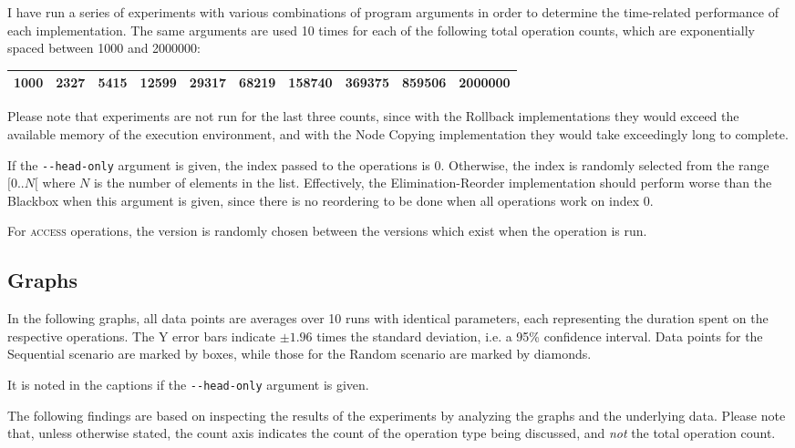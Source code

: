 I have run a series of experiments with various combinations of program
arguments in order to determine the time-related performance of each
implementation. The same arguments are used 10 times for each of the following
total operation counts, which are exponentially spaced between 1000 and 2000000:

\begin{tabular}{|l|l|l|l|l|l|l|l|l|l|}
\hline
1000 & 2327 & 5415 & 12599 & 29317 & 68219 & 158740 & 369375 & 859506 & 2000000\\
\hline
\end{tabular}

Please note that experiments are not run for the last three counts, since with
the Rollback implementations they would exceed the available memory of the
execution environment, and with the Node Copying implementation they would take
exceedingly long to complete.

If the \texttt{-\@{}-head-only} argument is given, the index passed to the
operations is 0. Otherwise, the index is randomly selected from the range
$[0..N[$ where $N$ is the number of elements in the list. Effectively, the
Elimination-Reorder implementation should perform worse than the Blackbox when
this argument is given, since there is no reordering to be done when all
operations work on index 0.

For \textsc{access} operations, the version is randomly chosen between the
versions which exist when the operation is run.

\subsection{Graphs}

In the following graphs, all data points are averages over 10 runs with
identical parameters, each representing the duration spent on the respective
operations. The Y error bars indicate $\pm 1.96$ times the standard deviation,
i.e. a 95\% confidence interval. Data points for the Sequential scenario are
marked by boxes, while those for the Random scenario are marked by diamonds.

It is noted in the captions if the \texttt{-\@{}-head-only} argument is given.

The following findings are based on inspecting the results of the experiments by
analyzing the graphs and the underlying data. Please note that, unless otherwise
stated, the count axis indicates the count of the operation type being
discussed, and \emph{not} the total operation count.

